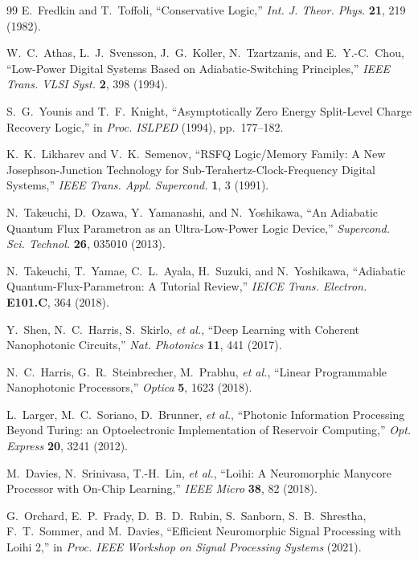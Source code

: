 \documentclass[11pt,twocolumn]{article}
\theoremstyle{definition}
\theoremstyle{remark}
\begin{document}
\begin{thebibliography}{99}
E.~Fredkin and T.~Toffoli, ``Conservative Logic,''
\textit{Int. J. Theor. Phys.} \textbf{21}, 219 (1982).

W.~C.~Athas, L.~J.~Svensson, J.~G.~Koller, N.~Tzartzanis, and
E.~Y.-C.~Chou, ``Low-Power Digital Systems Based on Adiabatic-Switching
Principles,'' \textit{IEEE Trans. VLSI Syst.} \textbf{2}, 398 (1994).

S.~G.~Younis and T.~F.~Knight, ``Asymptotically Zero Energy Split-Level
Charge Recovery Logic,'' in \textit{Proc. ISLPED} (1994), pp.~177--182.

K.~K.~Likharev and V.~K.~Semenov, ``RSFQ Logic/Memory Family: A New
Josephson-Junction Technology for Sub-Terahertz-Clock-Frequency Digital
Systems,'' \textit{IEEE Trans. Appl. Supercond.} \textbf{1}, 3 (1991).

N.~Takeuchi, D.~Ozawa, Y.~Yamanashi, and N.~Yoshikawa, ``An Adiabatic
Quantum Flux Parametron as an Ultra-Low-Power Logic Device,''
\textit{Supercond. Sci. Technol.} \textbf{26}, 035010 (2013).

N.~Takeuchi, T.~Yamae, C.~L.~Ayala, H.~Suzuki, and N.~Yoshikawa,
``Adiabatic Quantum-Flux-Parametron: A Tutorial Review,''
\textit{IEICE Trans. Electron.} \textbf{E101.C}, 364 (2018).

Y.~Shen, N.~C.~Harris, S.~Skirlo, \textit{et al.}, ``Deep Learning
with Coherent Nanophotonic Circuits,'' \textit{Nat. Photonics}
\textbf{11}, 441 (2017).

N.~C.~Harris, G.~R.~Steinbrecher, M.~Prabhu, \textit{et al.},
``Linear Programmable Nanophotonic Processors,'' \textit{Optica}
\textbf{5}, 1623 (2018).

L.~Larger, M.~C.~Soriano, D.~Brunner, \textit{et al.}, ``Photonic
Information Processing Beyond Turing: an Optoelectronic Implementation
of Reservoir Computing,'' \textit{Opt. Express} \textbf{20}, 3241 (2012).

M.~Davies, N.~Srinivasa, T.-H.~Lin, \textit{et al.}, ``Loihi: A
Neuromorphic Manycore Processor with On-Chip Learning,''
\textit{IEEE Micro} \textbf{38}, 82 (2018).

G.~Orchard, E.~P.~Frady, D.~B.~D.~Rubin, S.~Sanborn, S.~B.~Shrestha,
F.~T.~Sommer, and M.~Davies, ``Efficient Neuromorphic Signal Processing
with Loihi 2,'' in \textit{Proc. IEEE Workshop on Signal Processing
Systems} (2021).


\end{thebibliography}
\end{document}
